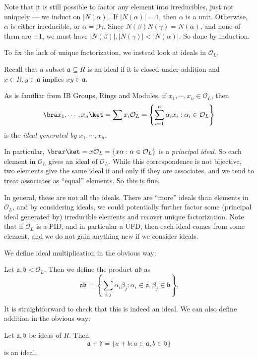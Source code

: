 \documentclass[a4paper]{article}
\begin{document}
Note that it is still possible to factor any element into irreducibles, just not uniquely --- we induct on $|N(\alpha)|$. If $|N(\alpha)| = 1$, then $\alpha$ is a unit. Otherwise, $\alpha$ is either irreducible, or $\alpha = \beta \gamma$. Since $N(\beta)N(\gamma) = N(\alpha)$, and none of them are $\pm 1$, we must have $|N(\beta)|, |N(\gamma)| < |N(\alpha)|$. So done by induction.

To fix the lack of unique factorization, we instead look at ideals in $\mathcal{O}_L$.

Recall that a subset $\mathfrak{a} \subseteq R$ is an ideal if it is closed under addition and $x \in R, y \in \mathfrak{a}$ implies $xy \in \mathfrak{a}$.

As is familiar from IB Groups, Rings and Modules, if $x_1, \cdots, x_n \in \mathcal{O}_L$, then
\[
  \bra x_1, \cdots, x_n\ket = \sum x_i \mathcal{O}_L = \left\{\sum_{i = 1}^n \alpha_i x_i : \alpha_i \in \mathcal{O}_L\right\}
\]
is the \emph{ideal generated by $x_1, \cdots, x_n$}.

In particular, $\bra x\ket = x \mathcal{O}_L = \{x\alpha: \alpha \in \mathcal{O}_L\}$ is a \emph{principal ideal}. So each element in $\mathcal{O}_L$ gives an ideal of $\mathcal{O}_L$. While this correspondence is not bijective, two elements give the same ideal if and only if they are associates, and we tend to treat associates as ``equal'' elements. So this is fine.

In general, these are not all the ideals. There are ``more'' ideals than elements in $\mathcal{O}_L$, and by considering ideals, we could potentially further factor some (principal ideal generated by) irreducible elements and recover unique factorization. Note that if $\mathcal{O}_L$ is a PID, and in particular a UFD, then each ideal comes from some element, and we do not gain anything new if we consider ideals.

We define ideal multiplication in the obvious way:
\begin{defi}
  Let $\mathfrak{a}, \mathfrak{b}\lhd \mathcal{O}_L$. Then we define the product $\mathfrak{a}\mathfrak{b}$ as
  \[
    \mathfrak{a} \mathfrak{b} = \left\{\sum_{i, j} \alpha_i \beta_j: \alpha_i \in \mathfrak{a}, \beta_j \in \mathfrak{b}\right\}.
  \]
\end{defi}
It is straightforward to check that this is indeed an ideal. We can also define addition in the obvious way:
\begin{defi}
  Let $\mathfrak{a}, \mathfrak{b}$ be ideas of $R$. Then
  \[
    \mathfrak{a} + \mathfrak{b} = \{a + b: a \in \mathfrak{a}, b \in \mathfrak{b}\}
  \]
  is an ideal.
\end{defi}
\end{document}
